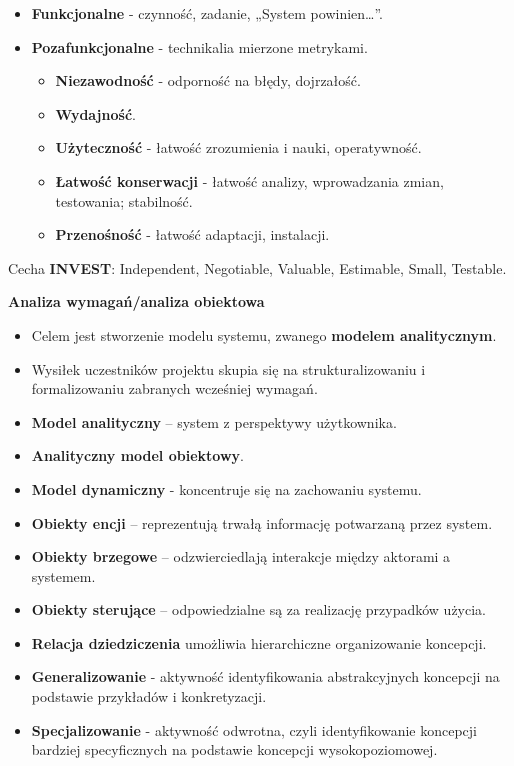 \documentclass[a4paper]{article}
\begin{document}
    \begin{itemize}
        \item \textbf{Funkcjonalne} - czynność, zadanie, „System powinien\dots”.
        \item \textbf{Pozafunkcjonalne} - technikalia mierzone metrykami.
        \begin{itemize}
            \item \textbf{Niezawodność} - odporność na błędy, dojrzałość.
            \item \textbf{Wydajność}.
            \item \textbf{Użyteczność} - łatwość zrozumienia i nauki, operatywność.
            \item \textbf{Łatwość konserwacji} - łatwość analizy, wprowadzania zmian, testowania; stabilność.
            \item \textbf{Przenośność} - łatwość adaptacji, instalacji.
        \end{itemize}
    \end{itemize}

    Cecha \textbf{INVEST}: Independent, Negotiable, Valuable, Estimable, Small, Testable.

    \textbf{Analiza wymagań/analiza obiektowa}
    \begin{itemize}
        \item Celem jest stworzenie modelu systemu, zwanego \textbf{modelem analitycznym}.
        \item Wysiłek uczestników projektu skupia się na strukturalizowaniu i formalizowaniu zabranych
        wcześniej wymagań.

        \item \textbf{Model analityczny} – system z perspektywy użytkownika.
        \item \textbf{Analityczny model obiektowy}.
        \item \textbf{Model dynamiczny} - koncentruje się na zachowaniu systemu.
        \item \textbf{Obiekty encji} – reprezentują trwałą informację potwarzaną przez system.
        \item \textbf{Obiekty brzegowe} – odzwierciedlają interakcje między aktorami a systemem.
        \item \textbf{Obiekty sterujące} – odpowiedzialne są za realizację przypadków użycia.
        \item \textbf{Relacja dziedziczenia} umożliwia hierarchiczne organizowanie koncepcji.
        \item \textbf{Generalizowanie} - aktywność identyfikowania abstrakcyjnych koncepcji na podstawie przykładów i konkretyzacji.
        \item \textbf{Specjalizowanie} - aktywność odwrotna, czyli identyfikowanie koncepcji bardziej specyficznych na podstawie koncepcji wysokopoziomowej.
    \end{itemize}
\end{document}
